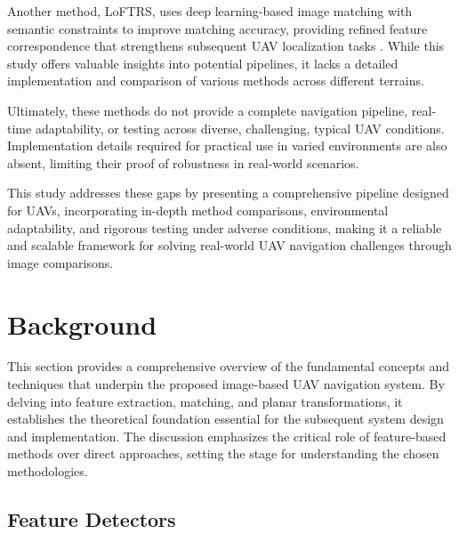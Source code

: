 Another method, LoFTRS, uses deep learning-based image matching with semantic constraints to improve matching accuracy, providing refined feature correspondence that strengthens subsequent UAV localization tasks \cite{Zhang2024}. While this study offers valuable insights into potential pipelines, it lacks a detailed implementation and comparison of various methods across different terrains.

Ultimately, these methods do not provide a complete navigation pipeline, real-time adaptability, or testing across diverse, challenging, typical UAV conditions. Implementation details required for practical use in varied environments are also absent, limiting their proof of robustness in real-world scenarios.

This study addresses these gaps by presenting a comprehensive pipeline designed for UAVs, incorporating in-depth method comparisons, environmental adaptability, and rigorous testing under adverse conditions, making it a reliable and scalable framework for solving real-world UAV navigation challenges through image comparisons. 



\section{Background}

This section provides a comprehensive overview of the fundamental concepts and techniques that underpin the proposed image-based UAV navigation system. By delving into feature extraction, matching, and planar transformations, it establishes the theoretical foundation essential for the subsequent system design and implementation. The discussion emphasizes the critical role of feature-based methods over direct approaches, setting the stage for understanding the chosen methodologies.





\subsection{Feature Detectors}

